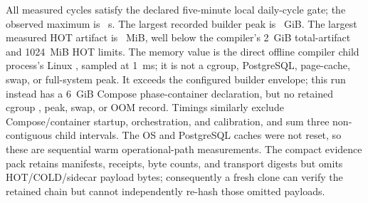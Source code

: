 \documentclass[journal,onecolumn]{IEEEtran}
\newcommand{\code}[1]{\texttt{\detokenize{#1}}}
\begin{document}
\begin{table}[t]
\centering
\caption{RQ5 offline publication results. Build columns are p50/p95; verify and
activate are p50. All times are seconds and artifact size is GiB.}
\label{tab:rq5-publications-supp}
\small
{}
\end{table}

All \RQFiveTotalBuildRuns{} measured cycles satisfy the declared five-minute
local daily-cycle gate; the observed maximum is \RQFiveMaxCycleS{}~s. The
largest recorded builder peak is \RQFiveBuilderPeakGiB{}~GiB. The largest
measured HOT artifact is \RQFiveHotArtifactMiB{}~MiB, well below the
compiler's 2~GiB total-artifact and 1024~MiB HOT limits. The memory value is the direct
offline compiler child process's Linux \code{VmHWM}, sampled at 1~ms; it is not
a cgroup, PostgreSQL, page-cache, swap, or full-system peak. It exceeds the
configured builder envelope; this run instead has a 6~GiB Compose
phase-container declaration, but no retained cgroup \code{memory.max}, peak,
swap, or OOM record. Timings similarly
exclude Compose/container startup, orchestration, and calibration, and sum
three non-contiguous child intervals. The OS and PostgreSQL caches were not
reset, so these are sequential warm operational-path measurements. The compact
evidence pack retains manifests, receipts, byte counts, and transport digests
but omits HOT/COLD/sidecar payload bytes; consequently a fresh clone can verify
the retained chain but cannot independently re-hash those omitted payloads.
\end{document}
